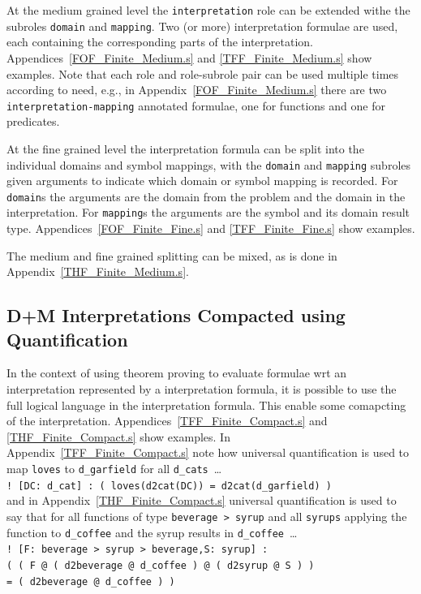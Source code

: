 \documentclass{easychair}
\newcommand{\smalltt}[1]{\small \texttt{#1}}
\begin{document}
At the medium grained level the {\tt interpretation} role can be extended withe the subroles
{\tt domain} and {\tt mapping}.
Two (or more) interpretation formulae are used, each containing the corresponding parts of the 
interpretation.
Appendices~\ref{FOF_Finite_Medium.s} and \ref{TFF_Finite_Medium.s} show examples.
Note that each role and role-subrole pair can be used multiple times according to need, e.g.,
in Appendix~\ref{FOF_Finite_Medium.s} there are two {\tt interpretation-mapping} annotated
formulae, one for functions and one for predicates.

At the fine grained level the interpretation formula can be split into the individual domains
and symbol mappings, with the {\tt domain} and {\tt mapping} subroles given arguments to indicate
which domain or symbol mapping is recorded.
For {\tt domain}s the arguments are the domain from the problem and the domain in the 
interpretation.
For {\tt mapping}s the arguments are the symbol and its domain result type.
Appendices~\ref{FOF_Finite_Fine.s} and \ref{TFF_Finite_Fine.s} show examples.

The medium and fine grained splitting can be mixed, as is done in 
Appendix~\ref{THF_Finite_Medium.s}.

\subsection{{\sf D+M} Interpretations Compacted using Quantification}
\label{NewTarskianCompact}

In the context of using theorem proving to evaluate formulae wrt an interpretation represented
by a interpretation formula, it is possible to use the full logical language in the interpretation 
formula.
This enable some comapcting of the interpretation.
Appendices~\ref{TFF_Finite_Compact.s} and \ref{THF_Finite_Compact.s} show examples.
In Appendix~\ref{TFF_Finite_Compact.s} note how universal quantification is used to map
{\tt loves} to {\tt d\_garfield} for all {\tt d\_cats}~\ldots \\
\hspace*{0.5cm}\smalltt{! [DC: d\_cat] : ( loves(d2cat(DC)) = d2cat(d\_garfield) )} \\
and in Appendix~\ref{THF_Finite_Compact.s} universal quantification is used to say that for all
functions of type {\tt beverage > syrup} and all {\tt syrups} applying the function to
{\tt d\_coffee} and the syrup results in {\tt d\_coffee}~\ldots \\
\hspace*{0.5cm}\smalltt{! [F: beverage > syrup > beverage,S: syrup] :} \\
\hspace*{1.0cm}\smalltt{( ( F @ ( d2beverage @ d\_coffee ) @ ( d2syrup @ S ) )} \\
\hspace*{1.0cm}\smalltt{= ( d2beverage @ d\_coffee ) )}
\end{document}
